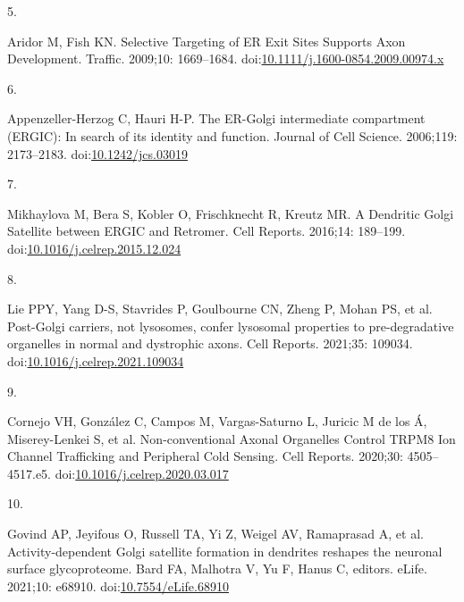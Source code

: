 \documentclass[
  12pt,
  a4paper,
]{article}
\newlength{\cslhangindent}
\newlength{\csllabelwidth}
\newlength{\cslentryspacingunit} %
\newenvironment{CSLReferences}[2] %
 {%
  \setlength{\parindent}{0pt}
  \ifodd #1
  \let\oldpar\par
  \def\par{\hangindent=\cslhangindent\oldpar}
  \fi
  \setlength{\parskip}{#2\cslentryspacingunit}
 }%
 {}
\newcommand{\CSLLeftMargin}[1]{\parbox[t]{\csllabelwidth}{#1}}
\newcommand{\CSLRightInline}[1]{\parbox[t]{\linewidth - \csllabelwidth}{#1}\break}
\begin{document}
\begin{CSLReferences}{0}{0}
\leavevmode{}%
\CSLLeftMargin{5. }%
\CSLRightInline{Aridor M, Fish KN. Selective {Targeting} of {ER Exit
Sites Supports Axon Development}. Traffic. 2009;10: 1669--1684.
doi:\href{https://doi.org/10.1111/j.1600-0854.2009.00974.x}{10.1111/j.1600-0854.2009.00974.x}}

\leavevmode{}%
\CSLLeftMargin{6. }%
\CSLRightInline{Appenzeller-Herzog C, Hauri H-P. The {ER-Golgi}
intermediate compartment ({ERGIC}): In search of its identity and
function. Journal of Cell Science. 2006;119: 2173--2183.
doi:\href{https://doi.org/10.1242/jcs.03019}{10.1242/jcs.03019}}

\leavevmode{}%
\CSLLeftMargin{7. }%
\CSLRightInline{Mikhaylova M, Bera S, Kobler O, Frischknecht R, Kreutz
MR. A {Dendritic Golgi Satellite} between {ERGIC} and {Retromer}. Cell
Reports. 2016;14: 189--199.
doi:\href{https://doi.org/10.1016/j.celrep.2015.12.024}{10.1016/j.celrep.2015.12.024}}

\leavevmode{}%
\CSLLeftMargin{8. }%
\CSLRightInline{Lie PPY, Yang D-S, Stavrides P, Goulbourne CN, Zheng P,
Mohan PS, et al. Post-{Golgi} carriers, not lysosomes, confer lysosomal
properties to pre-degradative organelles in normal and dystrophic axons.
Cell Reports. 2021;35: 109034.
doi:\href{https://doi.org/10.1016/j.celrep.2021.109034}{10.1016/j.celrep.2021.109034}}

\leavevmode{}%
\CSLLeftMargin{9. }%
\CSLRightInline{Cornejo VH, González C, Campos M, Vargas-Saturno L,
Juricic M de los Á, Miserey-Lenkei S, et al. Non-conventional {Axonal
Organelles Control TRPM8 Ion Channel Trafficking} and {Peripheral Cold
Sensing}. Cell Reports. 2020;30: 4505--4517.e5.
doi:\href{https://doi.org/10.1016/j.celrep.2020.03.017}{10.1016/j.celrep.2020.03.017}}

\leavevmode{}%
\CSLLeftMargin{10. }%
\CSLRightInline{Govind AP, Jeyifous O, Russell TA, Yi Z, Weigel AV,
Ramaprasad A, et al. Activity-dependent {Golgi} satellite formation in
dendrites reshapes the neuronal surface glycoproteome. Bard FA, Malhotra
V, Yu F, Hanus C, editors. eLife. 2021;10: e68910.
doi:\href{https://doi.org/10.7554/eLife.68910}{10.7554/eLife.68910}}


\end{CSLReferences}
\end{document}
